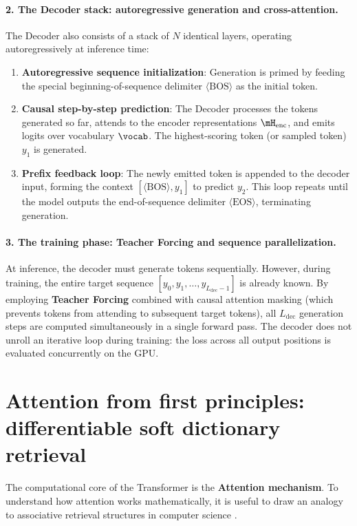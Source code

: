 \documentclass[../../main.tex]{subfiles}
\begin{document}
\paragraph{2. The Decoder stack: autoregressive generation and cross-attention.}
The Decoder also consists of a stack of $N$ identical layers, operating autoregressively at inference time:
\begin{enumerate}
    \item \textbf{Autoregressive sequence initialization}: Generation is primed by feeding the special beginning-of-sequence delimiter $\langle\text{BOS}\rangle$ as the initial token.
    \item \textbf{Causal step-by-step prediction}: The Decoder processes the tokens generated so far, attends to the encoder representations $\mH_{\text{enc}}$, and emits logits over vocabulary $\vocab$. The highest-scoring token (or sampled token) $y_1$ is generated.
    \item \textbf{Prefix feedback loop}: The newly emitted token is appended to the decoder input, forming the context $[\langle\text{BOS}\rangle, y_1]$ to predict $y_2$. This loop repeats until the model outputs the end-of-sequence delimiter $\langle\text{EOS}\rangle$, terminating generation.
\end{enumerate}

\paragraph{3. The training phase: Teacher Forcing and sequence parallelization.}
At inference, the decoder must generate tokens sequentially. However, during training, the entire target sequence $[y_0, y_1, \dots, y_{L_{\text{dec}}-1}]$ is already known.
By employing \textbf{Teacher Forcing} combined with causal attention masking (which prevents tokens from attending to subsequent target tokens), all $L_{\text{dec}}$ generation steps are computed simultaneously in a single forward pass. The decoder does not unroll an iterative loop during training: the loss across all output positions is evaluated concurrently on the GPU.

\section{Attention from first principles: differentiable soft dictionary retrieval}
\label{sec:attention_first_principles}

The computational core of the Transformer is the \textbf{Attention mechanism}. To understand how attention works mathematically, it is useful to draw an analogy to associative retrieval structures in computer science \cite{jurafsky2024, sanderson2024attention}.
\end{document}
